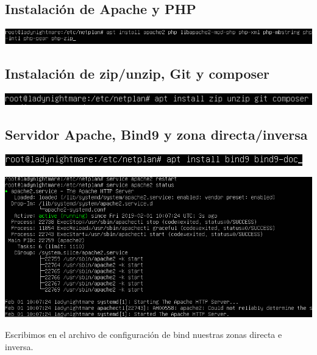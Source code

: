 \documentclass{article}
\begin{document}
\subsection{Instalación de Apache y PHP}

\begin{center}
\includegraphics[scale=0.5]{images/apachePHP.png}
\end{center}

\subsection{Instalación de zip/unzip, Git y composer}

\begin{center}
\includegraphics[scale=0.6]{images/zipunzipgitcomposer.png}
\end{center}

\subsection{Servidor Apache, Bind9 y zona directa/inversa}

\begin{center}
\includegraphics[scale=0.6]{images/bind9.png}
\end{center}

\begin{center}
\includegraphics[scale=0.4]{images/apacheRestart.png}
\end{center}

Escribimos en el archivo de configuración de bind nuestras zonas directa e inversa.
\end{document}
